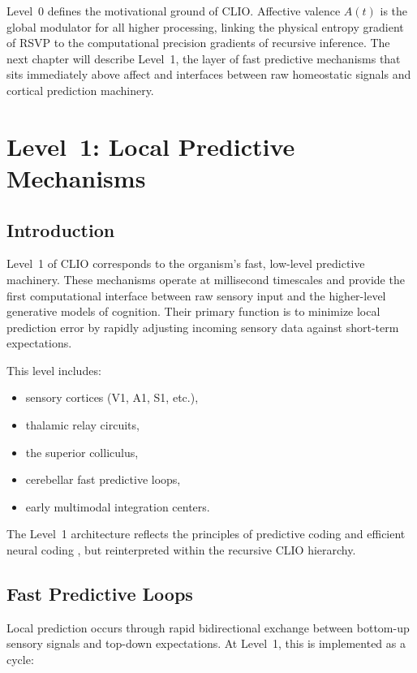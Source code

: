 \documentclass[12pt,oneside]{book}
\theoremstyle{plain}
\theoremstyle{definition}
\let\citep\parencite
\begin{document}
Level~0 defines the motivational ground of CLIO.
Affective valence $A(t)$ is the global modulator for all higher
processing, linking the physical entropy gradient of RSVP to the
computational precision gradients of recursive inference.
The next chapter will describe Level~1, the layer of fast predictive
mechanisms that sits immediately above affect and interfaces between
raw homeostatic signals and cortical prediction machinery.

\chapter{Level~1: Local Predictive Mechanisms}

\section{Introduction}

Level~1 of CLIO corresponds to the organism’s fast, low-level predictive
machinery.
These mechanisms operate at millisecond timescales and provide the first
computational interface between raw sensory input and the higher-level
generative models of cognition.
Their primary function is to minimize local prediction error by rapidly
adjusting incoming sensory data against short-term expectations.

This level includes:

\begin{itemize}
  \item sensory cortices (V1, A1, S1, etc.),
  \item thalamic relay circuits,
  \item the superior colliculus,
  \item cerebellar fast predictive loops,
  \item early multimodal integration centers.
\end{itemize}

The Level~1 architecture reflects the principles of predictive coding
\citep{rao1999predictive,friston2005theory} and efficient neural coding
\citep{barlow1961possible}, but reinterpreted within the recursive
CLIO hierarchy.

\section{Fast Predictive Loops}

Local prediction occurs through rapid bidirectional exchange between
bottom-up sensory signals and top-down expectations.
At Level~1, this is implemented as a cycle:
\end{document}
